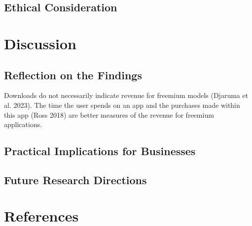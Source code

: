 \documentclass[
  12pt,
  a4paper,
]{article}
\begin{document}
\subsection{Ethical Consideration}\label{ethical-consideration}

\section{\texorpdfstring{Discussion }{Discussion }}\label{discussion}

\subsection{Reflection on the
Findings}\label{reflection-on-the-findings}

Downloads do not necessarily indicate revenue for freemium models
(Djaruma et al. 2023). The time the user spends on an app and the
purchases made within this app (Ross 2018) are better measures of the
revenue for freemium applications.

\subsection{Practical Implications for
Businesses}\label{practical-implications-for-businesses}

\subsection{Future Research
Directions}\label{future-research-directions}

\section{References}\label{references}
\end{document}
